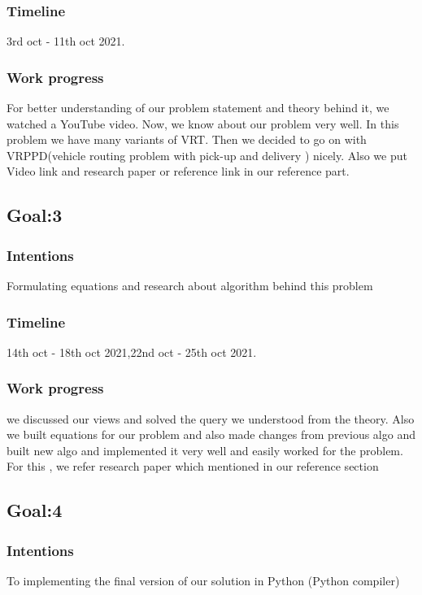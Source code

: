 \documentclass[conference]{IEEEtran}
\begin{document}
\subsubsection{{\textbf{Timeline}}} 3rd oct - 11th oct 2021. \\ 
\subsubsection{{\textbf{Work progress}}}
For better understanding of our problem statement and theory behind it, we watched a YouTube video. Now, we know about our problem very well. In this problem we have many variants of VRT. Then we decided to go on with  VRPPD(vehicle routing problem with pick-up and delivery ) nicely. Also we put Video link and research paper or reference link in our reference part.  

\subsection{{\textbf{Goal:3}}}

\subsubsection{{\textbf{Intentions}}}
 Formulating equations  and research about algorithm  behind this problem  \\

\subsubsection{{\textbf{Timeline}}}14th oct - 18th oct 2021,22nd oct - 25th oct 2021. \\ 
 
\subsubsection{{\textbf{Work progress}}}
we discussed our views and solved the query we understood from the theory. Also we built equations for our problem and also made changes from previous algo and built new algo and implemented it very well and easily  worked for the problem. For  this , we refer research paper which mentioned in our  reference section   


\subsection{{\textbf{Goal:4}}}

\subsubsection{{\textbf{Intentions}}}
To implementing the final version of our solution in Python (Python compiler) \\  
\end{document}
